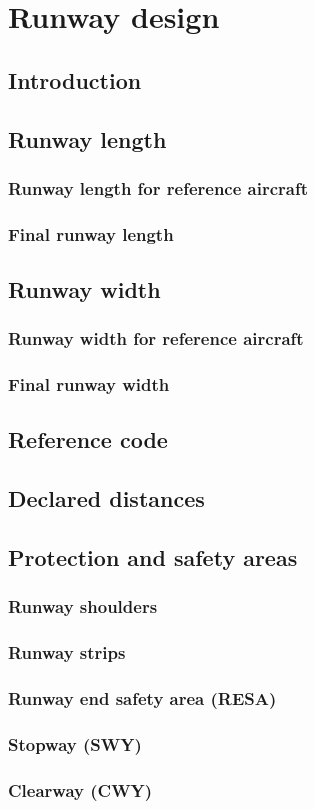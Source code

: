 \chapter{Runway design}

	\section{Introduction}
	
	\section{Runway length}
		\subsection{Runway length for reference aircraft}
		\subsection{Final runway length}
		
	\section{Runway width}
		\subsection{Runway width for reference aircraft}
		\subsection{Final runway width}
		
	\section{Reference code}
	
	\section{Declared distances}
	
	\section{Protection and safety areas}
		\subsection{Runway shoulders}
		\subsection{Runway strips}
		\subsection{Runway end safety area (RESA)}
		\subsection{Stopway (SWY)}
		\subsection{Clearway (CWY)}
		